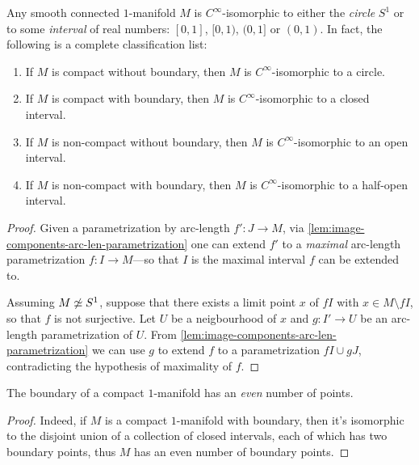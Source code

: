 \begin{theorem}
\label{thm:classification-of-1-manifolds}
Any smooth connected \(1\)-manifold \(M\) is \(C^{\infty}\)-isomorphic to either
the \emph{circle} \(S^1\) or to some \emph{interval} of real numbers:
\([0, 1]\), \([0, 1)\), \((0, 1]\) or \((0, 1)\). In fact, the following is a
complete classification list:
\begin{enumerate}[(1)]\setlength\itemsep{0em}
\item If \(M\) is compact without boundary, then \(M\) is
  \(C^{\infty}\)-isomorphic to a circle.

\item If \(M\) is compact with boundary, then \(M\) is \(C^{\infty}\)-isomorphic
  to a closed interval.

\item If \(M\) is non-compact without boundary, then \(M\) is
  \(C^{\infty}\)-isomorphic to an open interval.

\item If \(M\) is non-compact with boundary, then \(M\) is
  \(C^{\infty}\)-isomorphic to a half-open interval.
\end{enumerate}
\end{theorem}

\begin{proof}
Given a parametrization by arc-length \(f': J \to M\), via
\cref{lem:image-components-arc-len-parametrization} one can extend \(f'\) to a
\emph{maximal} arc-length parametrization \(f: I \to M\)---so that \(I\) is the
maximal interval \(f\) can be extended to.

Assuming \(M \not\simeq S^{1}\), suppose that there exists a limit point \(x\) of
\(f I\) with \(x \in M \setminus f I\), so that \(f\) is not surjective. Let
\(U\) be a neigbourhood of \(x\) and \(g: I' \to U\) be an arc-length
parametrization of \(U\). From
\cref{lem:image-components-arc-len-parametrization} we can use \(g\) to extend
\(f\) to a parametrization \(f I \cup g J\), contradicting the hypothesis of
maximality of \(f\).
\end{proof}

\begin{corollary}
\label{cor:1-manifold-boundary-even-number-of-points}
The boundary of a compact \(1\)-manifold has an \emph{even} number of points.
\end{corollary}

\begin{proof}
Indeed, if \(M\) is a compact \(1\)-manifold with boundary, then it's
isomorphic to the disjoint union of a collection of closed intervals, each of
which has two boundary points, thus \(M\) has an even number of boundary points.
\end{proof}

